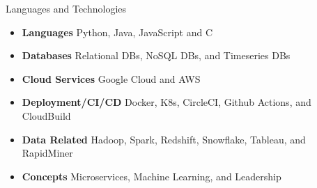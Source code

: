\documentclass[]{ahmedamrcv}
\begin{document}
	\begin{cvsection}{Languages and Technologies}
		\begin{cvsubsection}{}{}{}	
			\begin{itemize}
				\item \textbf{Languages} Python, Java, JavaScript and C
				\item \textbf{Databases}  Relational DBs, NoSQL DBs, and Timeseries DBs
				\item \textbf{Cloud Services}  Google Cloud and AWS
				\item \textbf{Deployment/CI/CD}  Docker, K8s, CircleCI, Github Actions, and CloudBuild
				\item \textbf{Data Related}  Hadoop, Spark, Redshift, Snowflake, Tableau, and RapidMiner
				\item \textbf{Concepts}  Microservices, Machine Learning, and Leadership
			\end{itemize}
		\end{cvsubsection}
	\end{cvsection}
\end{document}
